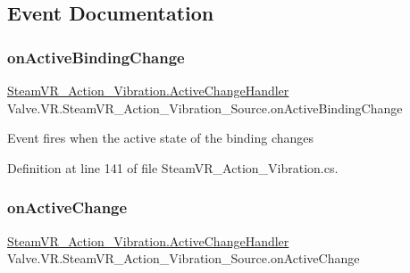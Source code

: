 \subsection{Event Documentation}
\mbox{\label{class_valve_1_1_v_r_1_1_steam_v_r___action___vibration___source_a5c652e9aaf0ceb77d49e033bae6ed6bb}} 
\subsubsection{\texorpdfstring{onActiveBindingChange}{onActiveBindingChange}}
{\footnotesize\ttfamily \mbox{\hyperlink{class_valve_1_1_v_r_1_1_steam_v_r___action___vibration_a7706b3c9b71de3bea16a3fab8a882f0b}{Steam\+V\+R\+\_\+\+Action\+\_\+\+Vibration.\+Active\+Change\+Handler}} Valve.\+V\+R.\+Steam\+V\+R\+\_\+\+Action\+\_\+\+Vibration\+\_\+\+Source.\+on\+Active\+Binding\+Change}



Event fires when the active state of the binding changes 



Definition at line 141 of file Steam\+V\+R\+\_\+\+Action\+\_\+\+Vibration.\+cs.

\mbox{\label{class_valve_1_1_v_r_1_1_steam_v_r___action___vibration___source_a231dc12e70ed1fae1efb7b3ae18332e3}} 
\subsubsection{\texorpdfstring{onActiveChange}{onActiveChange}}
{\footnotesize\ttfamily \mbox{\hyperlink{class_valve_1_1_v_r_1_1_steam_v_r___action___vibration_a7706b3c9b71de3bea16a3fab8a882f0b}{Steam\+V\+R\+\_\+\+Action\+\_\+\+Vibration.\+Active\+Change\+Handler}} Valve.\+V\+R.\+Steam\+V\+R\+\_\+\+Action\+\_\+\+Vibration\+\_\+\+Source.\+on\+Active\+Change}



